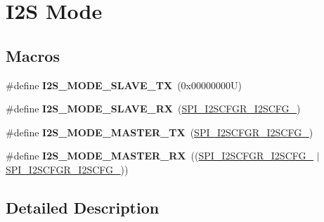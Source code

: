 \hypertarget{group___i2_s___mode}{}\section{I2S Mode}
\label{group___i2_s___mode}
\subsection*{Macros}
\begin{DoxyCompactItemize}
\item 
\mbox{\label{group___i2_s___mode_ga319dc7c9a746bb69bc8f0a2747b3ee0c}} 
\#define {\bfseries I2\+S\+\_\+\+M\+O\+D\+E\+\_\+\+S\+L\+A\+V\+E\+\_\+\+TX}~(0x00000000\+U)
\item 
\mbox{\label{group___i2_s___mode_ga0016b5776f96b393adf00ebcfec46eb7}} 
\#define {\bfseries I2\+S\+\_\+\+M\+O\+D\+E\+\_\+\+S\+L\+A\+V\+E\+\_\+\+RX}~(\hyperlink{group___peripheral___registers___bits___definition_ga421c94680ee8a2583419e2b0c89e995e}{S\+P\+I\+\_\+\+I2\+S\+C\+F\+G\+R\+\_\+\+I2\+S\+C\+F\+G\+\_})
\item 
\mbox{\label{group___i2_s___mode_ga2d70b3c9f774250186aa08c193f06c0d}} 
\#define {\bfseries I2\+S\+\_\+\+M\+O\+D\+E\+\_\+\+M\+A\+S\+T\+E\+R\+\_\+\+TX}~(\hyperlink{group___peripheral___registers___bits___definition_ga80c398b9e79fcc61a497f9d7dd910352}{S\+P\+I\+\_\+\+I2\+S\+C\+F\+G\+R\+\_\+\+I2\+S\+C\+F\+G\+\_})
\item 
\mbox{\label{group___i2_s___mode_ga368748b1b6170fd660bfee81c83d1e3f}} 
\#define {\bfseries I2\+S\+\_\+\+M\+O\+D\+E\+\_\+\+M\+A\+S\+T\+E\+R\+\_\+\+RX}~((\hyperlink{group___peripheral___registers___bits___definition_ga421c94680ee8a2583419e2b0c89e995e}{S\+P\+I\+\_\+\+I2\+S\+C\+F\+G\+R\+\_\+\+I2\+S\+C\+F\+G\+\_} $\vert$ \hyperlink{group___peripheral___registers___bits___definition_ga80c398b9e79fcc61a497f9d7dd910352}{S\+P\+I\+\_\+\+I2\+S\+C\+F\+G\+R\+\_\+\+I2\+S\+C\+F\+G\+\_}))
\end{DoxyCompactItemize}


\subsection{Detailed Description}
